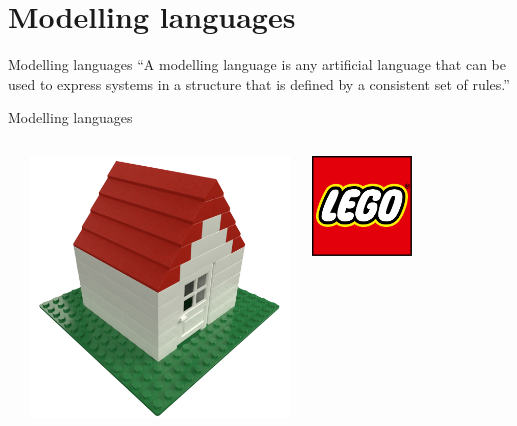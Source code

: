 \section{Modelling languages}

\begin{frame}{Modelling languages}
    ``A modelling language is any artificial language that can be used to express systems in a structure that is defined by a consistent set of rules.''
\end{frame}

\begin{frame}{Modelling languages}
\begin{columns}[c]
    \begin{column}{0.05\textwidth}
    \end{column}\begin{column}{0.45\textwidth}
        \includegraphics[width=\textwidth]{images/02_modelling_languages/lego_house.png}
    \end{column}\begin{column}{0.4\textwidth}
        \centering
        \includegraphics[width=0.5\textwidth]{images/02_modelling_languages/LEGO_logo.pdf}

\end{column}
\end{columns}
\end{frame}

